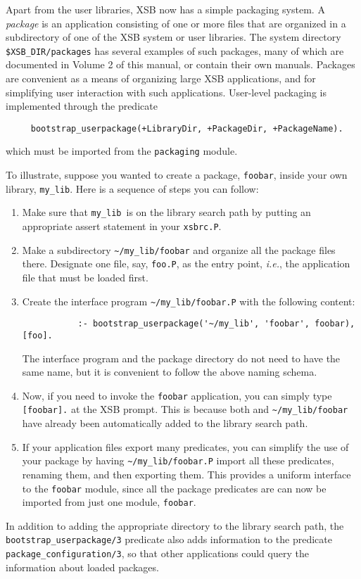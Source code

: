 Apart from the user libraries, XSB now has a simple packaging system.
A {\em package\/} is an application consisting of one or more files that
are organized in a subdirectory of one of the XSB system or user libraries.
The system directory \verb|$XSB_DIR/packages| has several examples
of such packages, many of which are documented in Volume 2 of this
manual, or contain their own manuals.  Packages are convenient
as a means of organizing large XSB applications, and for simplifying
user interaction with such applications.  User-level packaging is
implemented through the predicate
\begin{verbatim}
     bootstrap_userpackage(+LibraryDir, +PackageDir, +PackageName).
\end{verbatim}
which must be imported from the {\tt packaging} module. 

To illustrate, suppose you wanted to create a package, {\tt foobar}, inside
your own library, {\tt my\_lib}. Here is a sequence of steps you can
follow:  
\begin{enumerate}
\item Make sure that {\tt my\_lib}\ is on the library search path by putting
  an appropriate assert statement in your {\tt xsbrc.P}.
\item Make a subdirectory \verb|~/my_lib/foobar| and organize all the
  package files there. Designate one file, say, {\tt foo.P}, as the
  entry point, {\it i.e.}, the application file that must be loaded first.
\item Create the interface program \verb|~/my_lib/foobar.P| with the
  following content:
    \begin{verbatim}
           :- bootstrap_userpackage('~/my_lib', 'foobar', foobar), [foo].
    \end{verbatim}
  The interface program and the package directory do not need to have the
  same name, but it is convenient to follow the above naming schema.
\item Now, if you need to invoke the {\tt foobar} application, you can
  simply type \verb|[foobar].| at the XSB prompt. This is because both and
  \verb|~/my_lib/foobar| have already been automatically added to the
  library search path.
\item If your application files export many predicates, you can simplify
  the use of your package by having \verb|~/my_lib/foobar.P| import all
  these predicates, renaming them, and then exporting them. This provides a
  uniform interface to the {\tt foobar} module, since all the package
  predicates are can now be imported from just one module, {\tt foobar}.
\end{enumerate}
In addition to adding the appropriate directory to the library search
path, the \verb|bootstrap_userpackage/3| predicate also adds
information to the predicate \verb|package_configuration/3|, so that
other applications could query the information about loaded packages.

